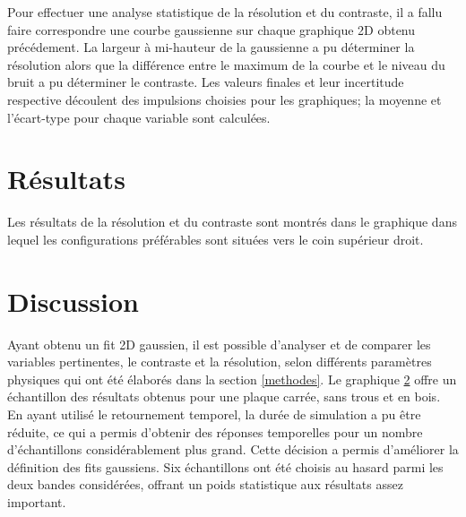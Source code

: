 \documentclass[conference]{IEEEtran}
\begin{document}
Pour effectuer une analyse statistique de la résolution et du contraste, il a fallu 
faire correspondre une courbe gaussienne sur chaque graphique 2D obtenu précédement. 
La largeur à mi-hauteur de la gaussienne a pu déterminer la résolution alors que la 
différence entre le maximum de la courbe et le niveau du bruit a pu déterminer le contraste.
Les valeurs finales et leur incertitude respective découlent des impulsions choisies pour 
les graphiques; la moyenne et l'écart-type pour chaque variable sont calculées.









\section{Résultats}

Les résultats de la résolution et du contraste sont montrés dans le graphique 
\cite{rés-con} dans lequel les configurations préférables sont situées vers le 
coin supérieur droit. 


\section{Discussion}
Ayant obtenu un fit 2D gaussien, il est possible d'analyser et de comparer les variables pertinentes, 
le contraste et la résolution, selon différents paramètres physiques qui ont été élaborés dans la section \ref{methodes}.
Le graphique \ref{} offre un échantillon des résultats obtenus pour une plaque carrée, sans trous et 
en bois. En ayant utilisé le retournement temporel, la durée de simulation a pu être réduite, ce qui a 
permis d'obtenir des réponses temporelles pour un nombre d'échantillons considérablement plus grand. 
Cette décision a permis d'améliorer la définition des fits gaussiens. Six échantillons ont été choisis au
hasard parmi les deux bandes considérées, offrant un poids statistique aux résultats assez important.
\end{document}
